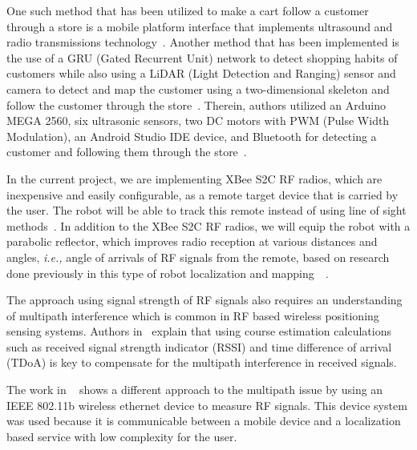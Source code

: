 \vspace*{12pt}
\noindent
One such method that has been utilized to make a cart follow a customer through a store is a mobile platform interface that implements ultrasound and radio transmissions technology~\cite{Sales2016-CompaRob}. Another method that has been implemented is the use of a GRU (Gated Recurrent Unit) network to detect shopping habits of customers while also using a LiDAR (Light Detection and Ranging) sensor and camera to detect and map the customer using a two-dimensional skeleton and follow the customer through the store~\cite{islam_lam_fukuda_kobayashi_kuno_2019}. Therein, authors utilized an Arduino MEGA 2560, six ultrasonic sensors, two DC motors with PWM (Pulse Width Modulation), an Android Studio IDE device, and Bluetooth for detecting a customer and following them through the store~\cite{Rawashdeh2017-Person}.

\vspace*{12pt}
\noindent
In the current project, we are implementing XBee S2C RF radios, which are inexpensive and easily configurable, as a remote target device that is carried by the user. The robot will be able to track this remote instead of using line of sight methods~\cite{Miah2018-Intelligent}. In addition to the XBee S2C RF radios, we will equip the robot with a parabolic reflector, which improves radio reception at various distances and angles, \textit{i.e.,} angle of arrivals of RF signals from the remote, based on research done previously in this type of robot localization and mapping~\cite{Miah2018-Intelligent}~\cite{Li2013ANA}.

\vspace*{12pt}
\noindent
The approach using signal strength of RF signals also requires an understanding of multipath interference which is common in RF based wireless positioning sensing systems. Authors in~\cite{xie_jiang_zhao_zhang_2019} explain that using course estimation calculations such as received signal strength indicator (RSSI) and time difference of arrival (TDoA) is key to compensate for the multipath interference in received signals.

\vspace*{12pt}
\noindent
The work in ~\cite{ladd_bekris_rudys_kavraki_wallach_2005} shows a different approach to the multipath issue by using an IEEE 802.11b wireless ethernet device to measure RF signals. This device system was used because it is communicable between a mobile device and a localization based service with low complexity for the user.

